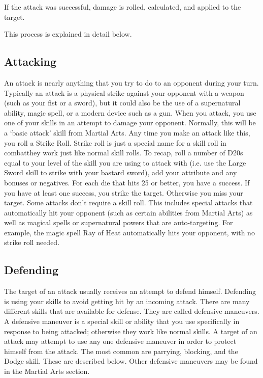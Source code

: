 \documentclass[twoside]{book}
\begin{document}
                
                
                   If the attack was successful, damage is rolled,
                   calculated, and applied to the target. 
                
             This process is explained in detail below. 
\subsection{Attacking}
     An attack is nearly anything that you try to do to
               an opponent during your turn. Typically an attack is a
               physical strike against your opponent with a weapon (such
               as your fist or a sword), but it could also be the use of
               a supernatural ability, magic spell, or a modern device
               such as a gun.  When you attack, you use one of your skills in an
              attempt to damage your opponent. Normally, this will be a
              `basic attack' skill from Martial Arts. Any
              time you make an attack like this, you roll a Strike Roll.
              Strike roll is just a special name for a skill roll in
              combatthey work just like normal skill rolls. To
              recap, roll a number of D20s equal to your level of the
              skill you are using to attack with (i.e. use the Large
              Sword skill to strike with your bastard sword), add your
              attribute and any bonuses or negatives. For each die that
              hits 25 or better, you have a success.
                If you have at least one success, you strike the
                target.   Otherwise you miss your target.
             Some attacks don't require a skill roll. This
               includes special attacks that automatically hit your
               opponent (such as certain abilities from Martial Arts) as
               well as magical spells or supernatural powers that are
               auto-targeting. For example, the magic spell Ray of Heat
               automatically hits your opponent, with no strike roll
               needed. 
\subsection{Defending}
     The target of an attack usually receives an attempt
              to defend himself.
                Defending is using your skills to avoid getting hit
                by an incoming attack.   There are many different
                skills that are available for defense. They are called
                defensive maneuvers. A defensive maneuver is a special
                skill or ability that you use specifically in response to
                being attacked; otherwise they work like normal skills. A
                target of an attack may attempt to use any one defensive
                maneuver in order to protect himself from the attack. The
                most common are parrying, blocking, and the Dodge skill.
                These are described below. Other defensive maneuvers may
                be found in the Martial Arts section.
              
\end{document}
